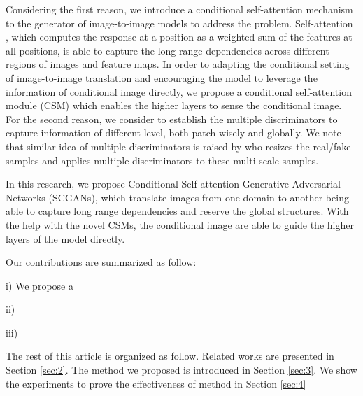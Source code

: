 Considering the first reason, we introduce a conditional self-attention mechanism to the generator of image-to-image models to address the problem.
Self-attention \cite{Non-local, Attention, MachineReading, SAGAN}, which computes the response at a position as a weighted sum of the features at all positions, is able to capture the long range dependencies across different regions of images and feature maps. In order to adapting the conditional setting of image-to-image translation and encouraging the model to leverage the information of conditional image directly, we propose a conditional self-attention module (CSM) which enables the higher layers to sense the conditional image. 
%
For the second reason, we consider to establish the multiple discriminators to capture information of different level, both patch-wisely and globally. We note that similar idea of multiple discriminators is raised by \cite{Multi-D} who resizes the real/fake samples and applies multiple discriminators to these multi-scale samples. 

In this research, we propose Conditional Self-attention Generative Adversarial Networks (SCGANs), which translate images from one domain to another being able to capture long range dependencies and reserve the global structures. With the help with the novel CSMs, the conditional image are able to guide the higher layers of the model directly.  

Our contributions are summarized as follow:

i) We propose a 

ii)

iii)

The rest of this article is organized as follow. Related works are presented in Section \ref{sec:2}. The method we proposed is introduced in Section \ref{sec:3}. We show the experiments to prove the effectiveness of method in Section \ref{sec:4}